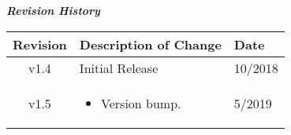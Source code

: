 \begin{center}
	\textit{\textbf{Revision History}}
		\begin{table}[H]
		\label{table:revisions} %
			\begin{tabularx}{\textwidth}{|c|X|l|}
			\hline
			\rowcolor{blue}
			\textbf{Revision} & \textbf{Description of Change} & \textbf{Date} \\
		    \hline
		    v1.4 & Initial Release & 10/2018 \\
		    \hline
        v1.5 & \begin{itemize} \item Version bump.  \end{itemize} & 5/2019 \\
		    \hline
			\end{tabularx}
		\end{table}
	\end{center}	
	
